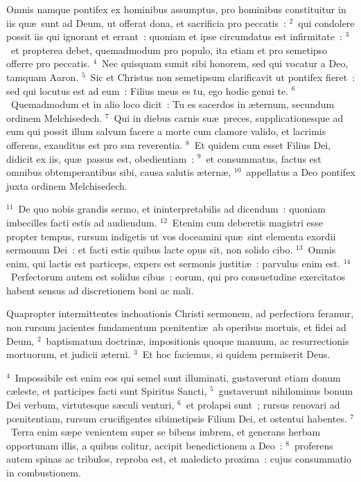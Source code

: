 \lettrine[lines=3,image=true,loversize=0.05,lraise=-0.03]{O}{}mnis namque pontifex ex hominibus assumptus, pro hominibus constituitur in iis qu\ae\ sunt ad Deum, ut offerat dona, et sacrificia pro peccatis~:
${}^{2}$~qui condolere possit iis qui ignorant et errant~: quoniam et ipse circumdatus est infirmitate~:
${}^{3}$~et propterea debet, quemadmodum pro populo, ita etiam et pro semetipso offerre pro peccatis.
${}^{4}$~Nec quisquam sumit sibi honorem, sed qui vocatur a Deo, tamquam Aaron.
${}^{5}$~Sic et Christus non semetipsum clarificavit ut pontifex fieret~: sed qui locutus est ad eum~: Filius meus es tu, ego hodie genui te.
${}^{6}$~Quemadmodum et in alio loco dicit~: Tu es sacerdos in \ae ternum, secundum ordinem Melchisedech.
${}^{7}$~Qui in diebus carnis su\ae\ preces, supplicationesque ad eum qui possit illum salvum facere a morte cum clamore valido, et lacrimis offerens, exauditus est pro sua reverentia.
${}^{8}$~Et quidem cum esset Filius Dei, didicit ex iis, qu\ae\ passus est, obedientiam~:
${}^{9}$~et consummatus, factus est omnibus obtemperantibus sibi, causa salutis \ae tern\ae ,
${}^{10}$~appellatus a Deo pontifex juxta ordinem Melchisedech.


${}^{11}$~De quo nobis grandis sermo, et ininterpretabilis ad dicendum~: quoniam imbecilles facti estis ad audiendum.
${}^{12}$~Etenim cum deberetis magistri esse propter tempus, rursum indigetis ut vos doceamini qu\ae\ sint elementa exordii sermonum Dei~: et facti estis quibus lacte opus sit, non solido cibo.
${}^{13}$~Omnis enim, qui lactis est particeps, expers est sermonis justiti\ae~: parvulus enim est.
${}^{14}$~Perfectorum autem est solidus cibus~: eorum, qui pro consuetudine exercitatos habent sensus ad discretionem boni ac mali.

\lettrine[lines=3,image=true,loversize=0.05,lraise=-0.03]{Q}{}uapropter intermittentes inchoationis Christi sermonem, ad perfectiora feramur, non rursum jacientes fundamentum pœnitenti\ae\ ab operibus mortuis, et fidei ad Deum,
${}^{2}$~baptismatum doctrin\ae , impositionis quoque manuum, ac resurrectionis mortuorum, et judicii \ae terni.
${}^{3}$~Et hoc faciemus, si quidem permiserit Deus.


${}^{4}$~Impossibile est enim eos qui semel sunt illuminati, gustaverunt etiam donum c\ae leste, et participes facti sunt Spiritus Sancti,
${}^{5}$~gustaverunt nihilominus bonum Dei verbum, virtutesque s\ae culi venturi,
${}^{6}$~et prolapsi sunt~; rursus renovari ad pœnitentiam, rursum crucifigentes sibimetipsis Filium Dei, et ostentui habentes.
${}^{7}$~Terra enim s\ae pe venientem super se bibens imbrem, et generans herbam opportunam illis, a quibus colitur, accipit benedictionem a Deo~:
${}^{8}$~proferens autem spinas ac tribulos, reproba est, et maledicto proxima~: cujus consummatio in combustionem.


